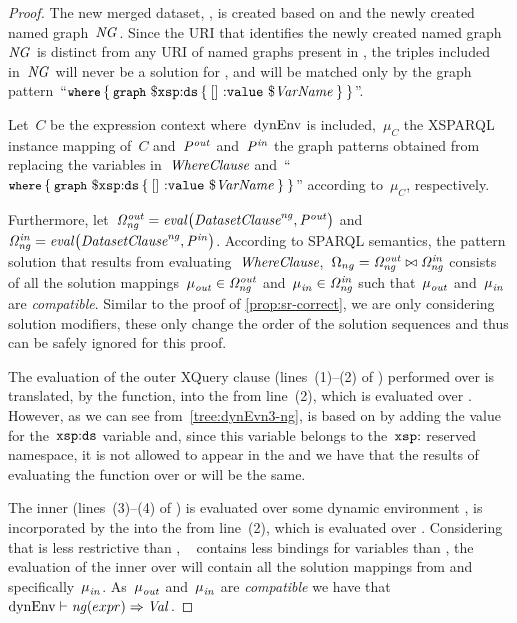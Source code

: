 \begin{proof}
  The new merged dataset, , is created based on \DatasetClause and the newly created named
  graph~$\mathit{{NG}_{}}$. Since the URI that identifies the newly created named graph~$\mathit{{NG}_{}}$ is distinct from
  any URI of named graphs present in \DatasetClause, the triples included in~$\mathit{{NG}_{}}$ will never be a solution
  for \SparqlWhereClause, and will be matched only by the graph pattern~``$\texttt{{\small where}} \left\{\: \texttt{{\small graph}}\ \$\mathtt{xsp{:}ds} \left\{\:
      \mathtt{[]\ {:}value}\ \$\mathit{VarName} \:\right\} \:\right\}$''.

  Let~$C$ be the expression context where~${\textrm{dynEnv}}$ is included,~$\mu_C$ the XSPARQL instance mapping of~$C$
  and~${\mathit{P}}_{\mathit{}}^{\mathit{out}}$ and~${\mathit{P}}_{\mathit{}}^{\mathit{in}}$ the graph patterns obtained from replacing the variables
  in~${\textit{Whe\-re\-Clause}}$ and~``$\texttt{{\small where}}\left\{\: \texttt{{\small graph}}~\$\mathtt{xsp{:}ds} \left\{\: \mathtt{ []~{:}value}~\$\mathit{VarName} \:\right\} \:\right\}$''
  according to~$\mu_C$, respectively.

  Furthermore, let~${\mathit{\Omega}}_{\mathit{ng}}^{\mathit{out}} = \mathit{eval}\!\left({\mathit{{\textit{Da\-ta\-set\-Clau\-se}}}}_{\mathit{}}^{\mathit{ng}}, {\mathit{P}}_{\mathit{}}^{\mathit{out}}\right)$ and~${\mathit{\Omega}}_{\mathit{ng}}^{\mathit{in}} =
  \mathit{eval}\!\left({\mathit{{\textit{Da\-ta\-set\-Clau\-se}}}}_{\mathit{}}^{\mathit{ng}}, {\mathit{P}}_{\mathit{}}^{\mathit{in}}\right)$.
  According to SPAR\-QL semantics, the pattern solution that results from evaluating~${\textit{Whe\-re\-Clause}}$,~$\Omega_{ng}
  = {\mathit{\Omega}}_{\mathit{ng}}^{\mathit{out}} \bowtie {\mathit{\Omega}}_{\mathit{ng}}^{\mathit{in}}$ consists of all the solution mappings~${\mathit{\mu}}_{\mathit{out}}^{\mathit{}} \in {\mathit{\Omega}}_{\mathit{ng}}^{\mathit{out}}$
  and~${\mathit{\mu}}_{\mathit{in}}^{\mathit{}} \in {\mathit{\Omega}}_{\mathit{ng}}^{\mathit{in}}$ such that~${\mathit{\mu}}_{\mathit{out}}^{\mathit{}}$ and~${\mathit{\mu}}_{\mathit{in}}^{\mathit{}}$ are \emph{compatible}.
  Similar to the proof of \cref{prop:sr-correct}, we are only considering \ORDERBY solution modifiers, these only change
  the order of the solution sequences and thus can be safely ignored for this proof.

  The evaluation of the outer XQuery \FOR clause (lines~(1)--(2) of ) performed over \dyn is translated, by
  the  function, into the  from line~(2), which is evaluated over .
  However, as we can see from~\eqref{tree:dynEvn3-ng},  is based on \dyn by adding the value for
  the~$\mathtt{xsp{:}ds}$ variable and, since this variable belongs to the~$\mathtt{xsp{:}}$ reserved namespace, it is not
  allowed to appear in the \SparqlWhereClause and we have that the results of evaluating the 
  function over \dyn or  will be the same.
 

  The inner \SparqlForClause (lines~(3)--(4) of ) is evaluated over some dynamic environment ,
  is incorporated by the  into the  from line~(2), which is evaluated over
  .
  Considering that  is less restrictive than , \ie~ contains less bindings for
  variables than \!, the evaluation of the inner \SparqlForClause over  will contain all the
  solution mappings from  and specifically~${\mathit{\mu}}_{\mathit{in}}^{\mathit{}}$.
  As~${\mathit{\mu}}_{\mathit{out}}^{\mathit{}}$ and~${\mathit{\mu}}_{\mathit{in}}^{\mathit{}}$ are \emph{compatible} we have that~${\textrm{dynEnv}} \vdash \mathit{ng}\!\left(expr\right) \Rightarrow
  \mathit{{Val}_{}}$.


\end{proof}
